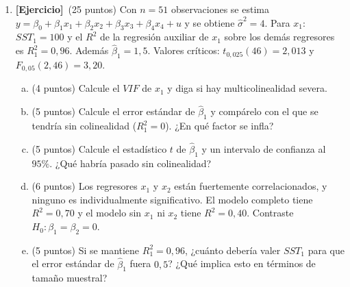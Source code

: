 \documentclass[12pt,letterpaper]{article}
\newcommand{\ejer}{\textbf{[Ejercicio]}}
\begin{document}
\begin{enumerate}[1.]
\item \ejer\ (25 puntos) Con $n=51$ observaciones se estima $y=\beta_0+\beta_1x_1+\beta_2x_2+\beta_3x_3+\beta_4x_4+u$ y se obtiene $\hat\sigma^2=4$. Para $x_1$: $SST_1=100$ y el $R^2$ de la regresión auxiliar de $x_1$ sobre los demás regresores es $R^2_1=0{,}96$. Además $\hat\beta_1=1{,}5$. Valores críticos: $t_{0{,}025}(46)=2{,}013$ y $F_{0{,}05}(2,46)=3{,}20$.
\begin{enumerate}[a)]
\item (4 puntos) Calcule el $VIF$ de $x_1$ y diga si hay multicolinealidad severa.
\item (5 puntos) Calcule el error estándar de $\hat\beta_1$ y compárelo con el que se tendría sin colinealidad ($R^2_1=0$). ¿En qué factor se infla?
\item (5 puntos) Calcule el estadístico $t$ de $\hat\beta_1$ y un intervalo de confianza al $95\%$. ¿Qué habría pasado sin colinealidad?
\item (6 puntos) Los regresores $x_1$ y $x_2$ están fuertemente correlacionados, y ninguno es individualmente significativo. El modelo completo tiene $R^2=0{,}70$ y el modelo sin $x_1$ ni $x_2$ tiene $R^2=0{,}40$. Contraste $H_0:\beta_1=\beta_2=0$.
\item (5 puntos) Si se mantiene $R^2_1=0{,}96$, ¿cuánto debería valer $SST_1$ para que el error estándar de $\hat\beta_1$ fuera $0{,}5$? ¿Qué implica esto en términos de tamaño muestral?
\end{enumerate}


\end{enumerate}
\end{document}

